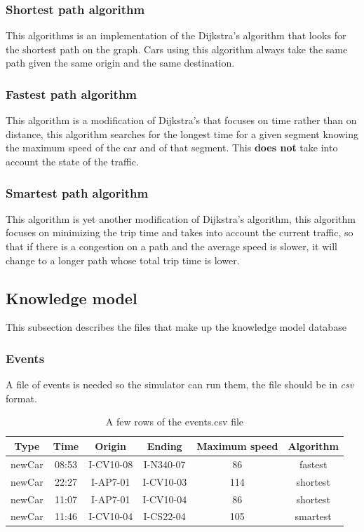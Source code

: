 \subsubsection{Shortest path algorithm}

This algorithms is an implementation of the Dijkstra's algorithm \cite{wikipedia_dijkstra} that looks for the shortest path on the graph. Cars using this algorithm always take the same path given the same origin and the same destination.

\subsubsection{Fastest path algorithm}

This algorithm is a modification of Dijkstra's that focuses on time rather than on distance, this algorithm searches for the longest time for a given segment knowing the maximum speed of the car and of that segment. This \textbf{does not} take into account the state of the traffic.

\subsubsection{Smartest path algorithm}

This algorithm is yet another modification of Dijkstra's algorithm, this algorithm focuses on minimizing the trip time and takes into account the current traffic, so that if there is a congestion on a path and the average speed is slower, it will change to a longer path whose total trip time is lower.

\subsection{Knowledge model}

This subsection describes the files that make up the knowledge model database

\subsubsection{Events}

A file of events is needed so the simulator can run them, the file should be in \textit{csv} format.

\begin{table}[H]
\centering
\begin{tabular}{|c|c|c|c|c|c|}
\hline 
\textbf{Type} & \textbf{Time} & \textbf{Origin} & \textbf{Ending} & \textbf{Maximum speed} & \textbf{Algorithm} \\ 
\hline 
newCar & 08:53 & I-CV10-08 & I-N340-07 & 86 & fastest \\ 
\hline 
newCar & 22:27 & I-AP7-01 & I-CV10-03 & 114 & shortest \\ 
\hline 
newCar & 11:07 & I-AP7-01 & I-CV10-04 & 86 & shortest \\ 
\hline 
newCar & 11:46 & I-CV10-04 & I-CS22-04 & 105 & smartest \\ 
\hline 
\end{tabular}
\caption{A few rows of the events.csv file}
\end{table}

